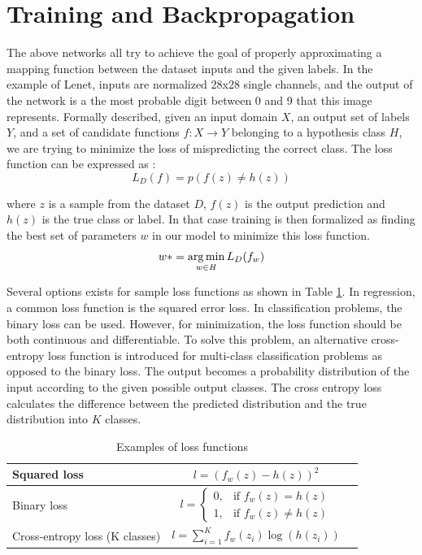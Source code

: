\section{Training and Backpropagation}

The above networks all try to achieve the goal of properly approximating a mapping function between the dataset inputs and the given labels. In the example of Lenet, inputs are normalized 28x28 single channels, and the output of the network is a the most probable digit between 0 and 9 that this image represents. Formally described, given an input domain $\mathit{X}$, an output set of labels $\mathit{Y}$, and a set of candidate functions $\mathit{f : X \rightarrow Y}$ belonging to a hypothesis class $\mathit{H}$, we are trying to minimize the loss of mispredicting the correct class. The loss function can be expressed as :
\begin{equation}
L_D(f) = p( f(z) \neq h(z)) 
\end{equation} 
 
 where $\mathit{z}$ is a sample from the dataset $\mathit{D}$,  $\mathit{f(z)}$ is the output prediction and $\mathit{h(z)}$ is the true class or label. In that case training is then formalized as finding the best set of parameters $\mathit{w}$ in our model to minimize this loss function. 
\begin{equation}
 w* = \operatorname*{arg\,min}\limits_{ w \in \mathit{H} } L_D(f_w)
 \end{equation}

Several options exists for sample loss functions as shown in Table \ref{tab:loss}. In regression, a common loss function is the squared error loss. In classification problems, the binary loss can be used. However, for minimization, the loss function should be both continuous and differentiable. To solve this problem, an alternative cross-entropy loss function is introduced for multi-class classification problems as opposed to the binary loss. The output becomes a probability distribution of the input according to the given possible output classes. The cross entropy loss calculates the difference between the predicted distribution and the true distribution into $\mathit{K}$ classes.

\begin{table}[h!]
	\centering
	\begin{tabular}{| l | c | r |}
		 \hline
	Squared loss 	& $l=(f_{w}(z)-h(z))^{2}$  \\ \hline
	Binary loss 	&  $l=\left\{\begin{array}{cl} 0, & \mbox{if }f_{w}(z)=h(z)\\ 1, & \mbox{if }f_{w}(z) \neq h(z) \end{array}\right.  $ \\ \hline
	Cross-entropy loss (K classes)	& $l=\sum_{i=1}^{K}f_{w}(z_{i})\log(h(z_{i}))$  \\
	 \hline
	\end{tabular}
\caption[Loss Functions]{Examples of loss functions}
\label{tab:loss}
\end{table}


